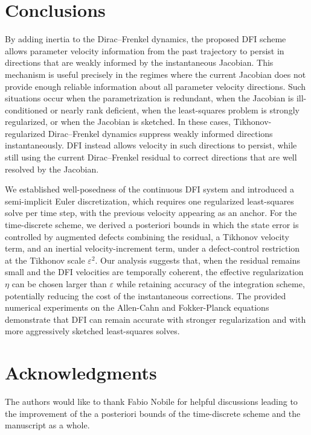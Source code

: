 \documentclass[oneside,11pt]{article}
\theoremstyle{remark}
\theoremstyle{thmstyleone}
\theoremstyle{thmstylethree}
\theoremstyle{thmstyletwo}
\newcommand{\tc}[1]{#1}
\begin{document}
\section{Conclusions}
By adding inertia to the Dirac--Frenkel dynamics, the proposed DFI scheme allows parameter velocity information from the past trajectory to persist in directions that are weakly informed by the instantaneous Jacobian. This mechanism is useful precisely in the regimes where the current Jacobian does not provide enough reliable information about all parameter velocity directions. Such situations occur when the parametrization is redundant, when the Jacobian is ill-conditioned or nearly rank deficient, when the least-squares problem is strongly regularized, or when the Jacobian is sketched. In these cases, Tikhonov-regularized Dirac--Frenkel dynamics suppress weakly informed directions instantaneously. DFI instead allows velocity in such directions to persist, while still using the current Dirac--Frenkel residual to correct directions that are well resolved by the Jacobian. 

We established well-posedness of the continuous DFI system and introduced a semi-implicit Euler discretization, which requires one regularized least-squares solve per time step, with the previous velocity appearing as an anchor. \tc{For the time-discrete scheme, we derived a posteriori bounds in which the state error is controlled by augmented defects combining the residual, a Tikhonov velocity term, and an inertial velocity-increment term, under a defect-control restriction at the Tikhonov scale $\varepsilon^2$. 
Our analysis suggests that, when the residual remains small and the DFI velocities are temporally coherent, the effective regularization $\eta$ can be chosen larger than $\varepsilon$ while retaining accuracy of the integration scheme, potentially reducing the cost of the instantaneous corrections.
The provided numerical experiments on the Allen-Cahn and Fokker-Planck equations demonstrate that DFI can remain accurate with stronger regularization and with more aggressively sketched least-squares solves.}

\tc{ 
\section*{Acknowledgments}
The authors would like to thank Fabio Nobile for helpful discussions leading to the improvement of the a posteriori bounds of the time-discrete scheme and the manuscript as a whole.
}



\end{document}
